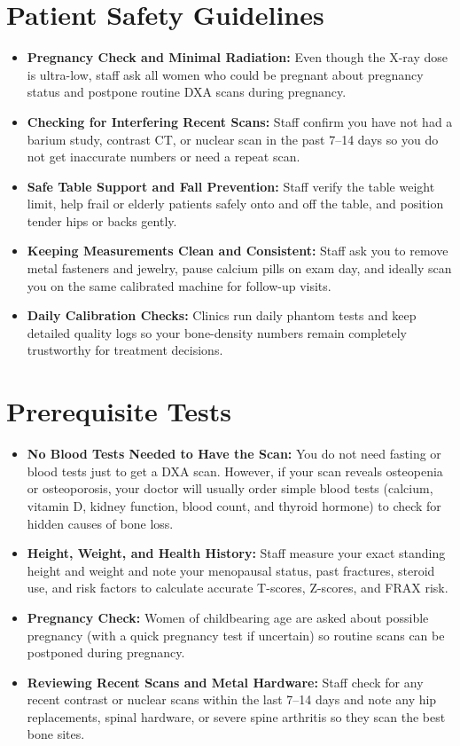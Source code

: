\section{Patient Safety Guidelines}
\begin{itemize}
\item \textbf{Pregnancy Check and Minimal Radiation:} Even though the X-ray dose is ultra-low, staff ask all women who could be pregnant about pregnancy status and postpone routine DXA scans during pregnancy.
\item \textbf{Checking for Interfering Recent Scans:} Staff confirm you have not had a barium study, contrast CT, or nuclear scan in the past 7--14 days so you do not get inaccurate numbers or need a repeat scan.
\item \textbf{Safe Table Support and Fall Prevention:} Staff verify the table weight limit, help frail or elderly patients safely onto and off the table, and position tender hips or backs gently.
\item \textbf{Keeping Measurements Clean and Consistent:} Staff ask you to remove metal fasteners and jewelry, pause calcium pills on exam day, and ideally scan you on the same calibrated machine for follow-up visits.
\item \textbf{Daily Calibration Checks:} Clinics run daily phantom tests and keep detailed quality logs so your bone-density numbers remain completely trustworthy for treatment decisions.
\end{itemize}

\section{Prerequisite Tests}
\begin{itemize}
\item \textbf{No Blood Tests Needed to Have the Scan:} You do not need fasting or blood tests just to get a DXA scan. However, if your scan reveals osteopenia or osteoporosis, your doctor will usually order simple blood tests (calcium, vitamin D, kidney function, blood count, and thyroid hormone) to check for hidden causes of bone loss.
\item \textbf{Height, Weight, and Health History:} Staff measure your exact standing height and weight and note your menopausal status, past fractures, steroid use, and risk factors to calculate accurate T-scores, Z-scores, and FRAX risk.
\item \textbf{Pregnancy Check:} Women of childbearing age are asked about possible pregnancy (with a quick pregnancy test if uncertain) so routine scans can be postponed during pregnancy.
\item \textbf{Reviewing Recent Scans and Metal Hardware:} Staff check for any recent contrast or nuclear scans within the last 7--14 days and note any hip replacements, spinal hardware, or severe spine arthritis so they scan the best bone sites.
\end{itemize}

